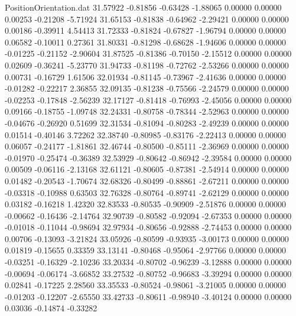 \begin{filecontents}{PositionOrientation.dat}
  31.57922   -0.81856   -0.63428    -1.88065    0.00000    0.00000    0.00253   -0.21208   -5.71924
  31.65153   -0.81838   -0.64962    -2.29421    0.00000    0.00000    0.00186   -0.39911    4.54413
  31.72333   -0.81824   -0.67827    -1.96794    0.00000    0.00000    0.06582   -0.10011    0.27361
  31.80331   -0.81298   -0.68628    -1.94606    0.00000    0.00000   -0.01225   -0.21152   -2.90604
  31.87525   -0.81386   -0.70150    -2.15512    0.00000    0.00000    0.02609   -0.36241   -5.23770
  31.94733   -0.81198   -0.72762    -2.53266    0.00000    0.00000    0.00731   -0.16729    1.61506
  32.01934   -0.81145   -0.73967    -2.41636    0.00000    0.00000   -0.01282   -0.22217    2.36855
  32.09135   -0.81238   -0.75566    -2.24579    0.00000    0.00000   -0.02253   -0.17848   -2.56239
  32.17127   -0.81418   -0.76993    -2.45056    0.00000    0.00000    0.09166   -0.18755   -1.09748
  32.24331   -0.80758   -0.78344    -2.52963    0.00000    0.00000   -0.04676   -0.26920    0.51699
  32.31534   -0.81094   -0.80283    -2.49239    0.00000    0.00000    0.01514   -0.40146    3.72262
  32.38740   -0.80985   -0.83176    -2.22413    0.00000    0.00000    0.06057   -0.24177   -1.81861
  32.46744   -0.80500   -0.85111    -2.36969    0.00000    0.00000   -0.01970   -0.25474   -0.36389
  32.53929   -0.80642   -0.86942    -2.39584    0.00000    0.00000    0.00509   -0.06116   -2.13168
  32.61121   -0.80605   -0.87381    -2.54914    0.00000    0.00000    0.01482   -0.20543   -1.70674
  32.68326   -0.80499   -0.88861    -2.67211    0.00000    0.00000   -0.03318   -0.10988    0.63503
  32.76328   -0.80764   -0.89741    -2.62129    0.00000    0.00000    0.03182   -0.16218    1.42320
  32.83533   -0.80535   -0.90909    -2.51876    0.00000    0.00000   -0.00662   -0.16436   -2.14764
  32.90739   -0.80582   -0.92094    -2.67353    0.00000    0.00000   -0.01018   -0.11044   -0.98694
  32.97934   -0.80656   -0.92888    -2.74453    0.00000    0.00000    0.00706   -0.13093   -3.21824
  33.05926   -0.80599   -0.93935    -3.00173    0.00000    0.00000    0.01819   -0.15655    0.33359
  33.13141   -0.80468   -0.95064    -2.97766    0.00000    0.00000   -0.03251   -0.16329   -2.10236
  33.20334   -0.80702   -0.96239    -3.12888    0.00000    0.00000   -0.00694   -0.06174   -3.66852
  33.27532   -0.80752   -0.96683    -3.39294    0.00000    0.00000    0.02841   -0.17225    2.28560
  33.35533   -0.80524   -0.98061    -3.21005    0.00000    0.00000   -0.01203   -0.12207   -2.65550
  33.42733   -0.80611   -0.98940    -3.40124    0.00000    0.00000    0.03036   -0.14874   -0.33282

\end{filecontents}
